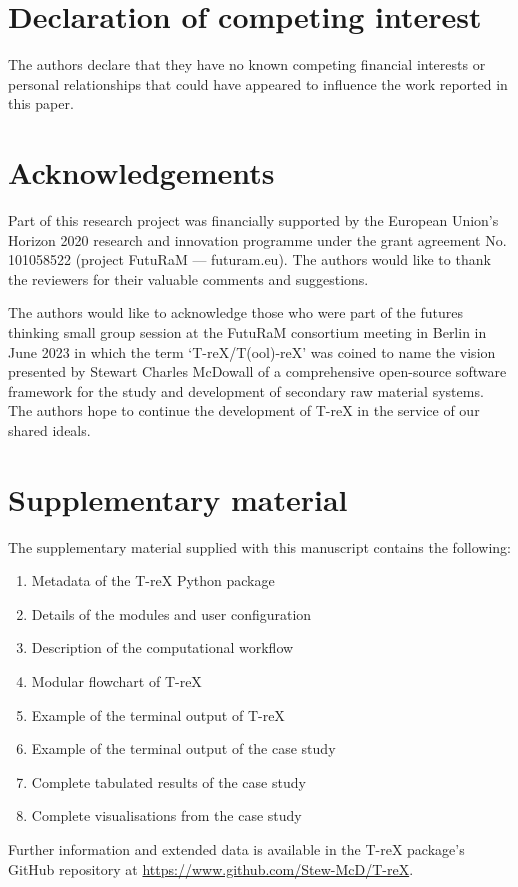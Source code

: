 \documentclass[review,3p,authoryear]{elsarticle}
\begin{document}
\section*{Declaration of competing interest}
The authors declare that they have no known competing financial interests or personal relationships that could have appeared to influence the work reported in this paper.

\section*{Acknowledgements}
Part of this research project was financially supported by the European Union's Horizon 2020 research and innovation programme under the grant agreement No. 101058522 (project FutuRaM --- futuram.eu). The authors would like to thank the reviewers for their valuable comments and suggestions.

The authors would like to acknowledge those who were part of the futures thinking small group session at the FutuRaM consortium meeting in Berlin in June 2023 in which the term `T-reX/T(ool)-reX' was coined to name the vision presented by Stewart Charles McDowall of a comprehensive open-source software framework for the study and development of secondary raw material systems. The authors hope to continue the development of T-reX in the service of our shared ideals.

\section{Supplementary material}\label{sec:supplementary}
The supplementary material supplied with this manuscript contains the following:
\begin{enumerate}
    \item Metadata of the T-reX Python package
    \item Details of the modules and user configuration
    \item Description of the computational workflow
    \item Modular flowchart of T-reX
    \item Example of the terminal output of T-reX
    \item Example of the terminal output of the case study
    \item Complete tabulated results of the case study
    \item Complete visualisations from the case study
\end{enumerate}
Further information and extended data is available in the T-reX package's GitHub repository at \url{https://www.github.com/Stew-McD/T-reX}.




\end{document}
